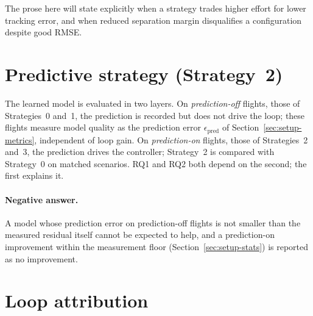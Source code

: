 The prose here will state explicitly when a strategy trades higher effort for lower tracking error,
and when reduced separation margin disqualifies a configuration despite good RMSE.

\section{Predictive strategy (Strategy~2)}
\label{sec:res2-nn}

The learned model is evaluated in two layers. On \emph{prediction-off} flights, those of
Strategies~0 and~1, the prediction is recorded but does not drive the loop; these flights measure
model quality as the prediction error $\epsilon_{\mathrm{pred}}$ of Section~\ref{sec:setup-metrics},
independent of loop gain. On \emph{prediction-on} flights, those of Strategies~2 and~3, the
prediction drives the controller; Strategy~2 is compared with Strategy~0 on matched scenarios. RQ1
and RQ2 both depend on the second; the first explains it.



\paragraph{Negative answer.} A model whose prediction error on prediction-off flights is not smaller
than the measured residual itself cannot be expected to help, and a prediction-on improvement
within the measurement floor (Section~\ref{sec:setup-stats}) is reported as no improvement.

\section{Loop attribution}
\label{sec:res2-attribution}

